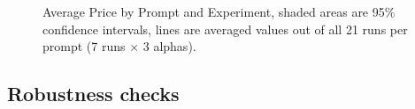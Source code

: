 \begin{figure}[H]
    \centering
    
    \caption{Average Price by Prompt and Experiment, shaded areas are 95\% confidence intervals, lines are averaged values out of all 21 runs per prompt (7 runs $\times$ 3 alphas).}
    \label{fig:ts_prices_comb}
\end{figure}


\subsection*{Robustness checks}\label{app:robust}

